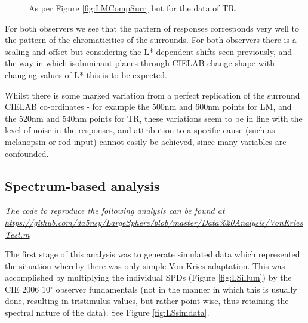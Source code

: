 \begin{figure}[htbp]
\caption{As per Figure \ref{fig:LMCompSurr} but for the data of TR.}
\label{fig:TRCompSurr}
\end{figure}

For both observers we see that the pattern of responses corresponds very well to the pattern of the chromaticities of the surrounds. For both observers there is a scaling and offset but considering the L* dependent shifts seen previously, and the way in which isoluminant planes through CIELAB change shape with changing values of L* this is to be expected.

Whilst there is some marked variation from a perfect replication of the surround CIELAB co-ordinates - for example the 500nm and 600nm points for LM, and the 520nm and 540nm points for TR, these variations seem to be in line with the level of noise in the responses, and attribution to a specific cause (such as melanopsin or rod input) cannot easily be achieved, since many variables are confounded.



\subsection{Spectrum-based analysis}

\textit{The code to reproduce the following analysis can be found at \url{https://github.com/da5nsy/LargeSphere/blob/master/Data\%20Analysis/VonKriesTest.m}}

The first stage of this analysis was to generate simulated data which represented the situation whereby there was only simple Von Kries adaptation. This was accomplished by multiplying the individual \glspl{SPD} (Figure \ref{fig:LSillum}) by the CIE 2006 10$^{\circ}$ observer fundamentals (not in the manner in which this is usually done, resulting in tristimulus values, but rather point-wise, thus retaining the spectral nature of the data). See Figure \ref{fig:LSsimdata}.


